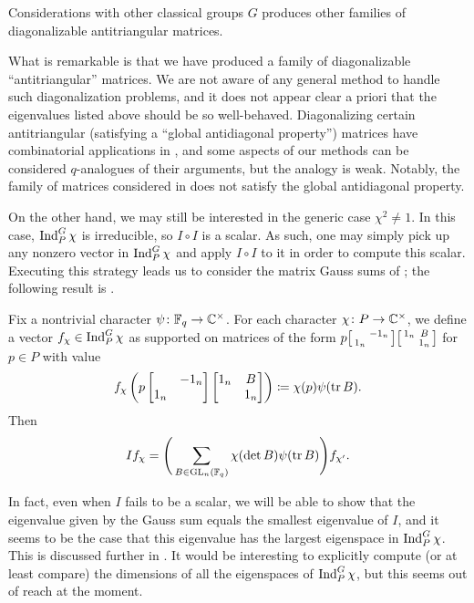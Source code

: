 \documentclass{amsart}
\begin{document}
\begin{remark}
    Considerations with other classical groups $G$ produces other families of diagonalizable antitriangular matrices.
\end{remark}
What is remarkable is that we have produced a family of diagonalizable ``antitriangular'' matrices. We are not aware of any general method to handle such diagonalization problems, and it does not appear clear a priori that the eigenvalues listed above should be so well-behaved. Diagonalizing certain antitriangular (satisfying a ``global antidiagonal property'') matrices have combinatorial applications in \cite{britnell-antitriangular}, and some aspects of our methods can be considered $q$-analogues of their arguments, but the analogy is weak. Notably, the family of matrices considered in  does not satisfy the global antidiagonal property.

On the other hand, we may still be interested in the generic case $\chi^2\ne1$. In this case, $\operatorname{Ind}^G_P\chi$ is irreducible, so $I\circ I$ is a scalar. As such, one may simply pick up any nonzero vector in $\operatorname{Ind}^G_P\chi$ and apply $I\circ I$ to it in order to compute this scalar. Executing this strategy leads us to consider the matrix Gauss sums of \cite{kim-gauss-sum}; the following result is .
\begin{theorem}
    Fix a nontrivial character $\psi\colon\mathbb F_q\to\mathbb C^\times$. For each character $\chi\colon P\to\mathbb C^\times$, we define a vector $f_\chi\in\operatorname{Ind}_P^G\chi$ as supported on matrices of the form $p\begin{bsmallmatrix}
        & -1_n \\ 1_n
    \end{bsmallmatrix}\begin{bsmallmatrix}
        1_n & B \\ & 1_n
    \end{bsmallmatrix}$ for $p\in P$ with value
    \[f_\chi\left(p\begin{bmatrix}
        & -1_n \\ 1_n
    \end{bmatrix}\begin{bmatrix}
        1_n & B \\ & 1_n
    \end{bmatrix}\right)\coloneqq\chi(p)\psi(\operatorname{tr} B).\]
    Then
    \[If_\chi=\Bigg(\sum_{B\in\mathrm{GL}_n(\mathbb F_q)}\chi(\det B)\psi(\operatorname{tr} B)\Bigg)f_{\chi'}.\]
\end{theorem}
\begin{remark}
    In fact, even when $I$ fails to be a scalar, we will be able to show that the eigenvalue given by the Gauss sum equals the smallest eigenvalue of $I$, and it seems to be the case that this eigenvalue has the largest eigenspace in $\operatorname{Ind}_P^G\chi$. This is discussed further in . It would be interesting to explicitly compute (or at least compare) the dimensions of all the eigenspaces of $\operatorname{Ind}_P^G\chi$, but this seems out of reach at the moment.
\end{remark}
\end{document}
